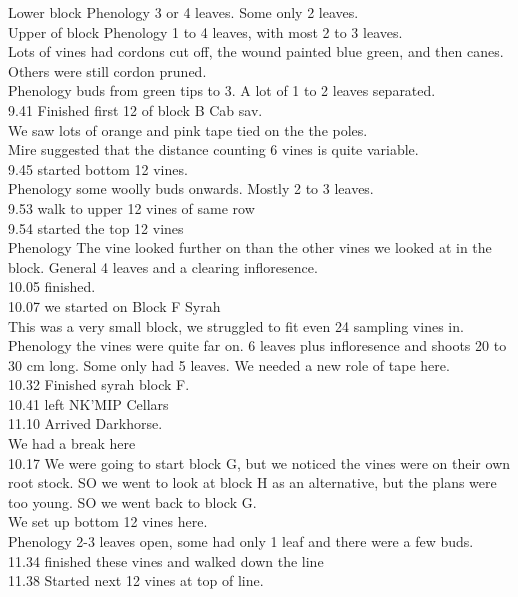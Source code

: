 \documentclass[11pt,letter]{article}
\newenvironment{smitemize}{
\begin{itemize}
  \setlength{\itemsep}{0pt}
  \setlength{\parskip}{0.8pt}
  \setlength{\parsep}{0pt}}
{\end{itemize}
}
\begin{document}
\begin{smitemize}
Lower block Phenology 3 or 4 leaves. Some only 2 leaves. \\
Upper of block Phenology 1 to 4 leaves, with most 2 to 3 leaves. \\
Lots of vines had cordons cut off, the wound painted blue green, and then canes. Others were still cordon pruned. \\
Phenology buds from green tips to 3. A lot of 1 to 2 leaves separated. \\
9.41 Finished first 12 of block B Cab sav.\\
We saw lots of orange and pink tape tied on the the poles.\\
Mire suggested that the distance counting 6 vines is quite variable.\\
9.45 started bottom 12 vines. \\
Phenology some woolly buds onwards. Mostly 2 to 3 leaves. \\
9.53 walk to upper 12 vines of same row \\
9.54 started the top 12 vines \\
Phenology The vine looked further on than the other vines we looked at in the block. General 4 leaves and a clearing infloresence. \\
10.05 finished.\\
10.07 we started on Block F Syrah\\
This was a very small block, we struggled to fit even 24 sampling vines in. \\
Phenology the vines were quite far on. 6 leaves plus infloresence and shoots 20 to 30 cm long. Some only had 5 leaves. 
We needed a new role of tape here. \\
10.32 Finished syrah block F.\\
10.41 left NK'MIP Cellars\\
11.10 Arrived Darkhorse. \\
We had a break here \\
10.17 We were going to start block G, but we noticed the vines were on their own root stock. SO we went to look at block H as an alternative, but the plans were too young. SO we went back to block G. \\
We set up bottom 12 vines here.\\
Phenology 2-3 leaves open, some had only 1 leaf and there were a few buds. \\
11.34 finished these vines and walked down the line \\
11.38 Started next 12 vines at top of line. \\

\end{smitemize}
\end{document}

